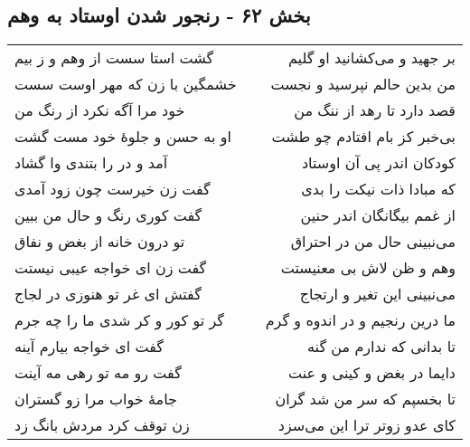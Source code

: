 \begin{center}
\section*{بخش ۶۲ - رنجور شدن اوستاد به وهم}
\label{sec:sh062}
\begin{longtable}{l p{0.5cm} r}
گشت استا سست از وهم و ز بیم
&&
بر جهید و می‌کشانید او گلیم
\\
خشمگین با زن که مهر اوست سست
&&
من بدین حالم نپرسید و نجست
\\
خود مرا آگه نکرد از رنگ من
&&
قصد دارد تا رهد از ننگ من
\\
او به حسن و جلوهٔ خود مست گشت
&&
بی‌خبر کز بام افتادم چو طشت
\\
آمد و در را بتندی وا گشاد
&&
کودکان اندر پی آن اوستاد
\\
گفت زن خیرست چون زود آمدی
&&
که مبادا ذات نیکت را بدی
\\
گفت کوری رنگ و حال من ببین
&&
از غمم بیگانگان اندر حنین
\\
تو درون خانه از بغض و نفاق
&&
می‌نبینی حال من در احتراق
\\
گفت زن ای خواجه عیبی نیستت
&&
وهم و ظن لاش بی معنیستت
\\
گفتش ای غر تو هنوزی در لجاج
&&
می‌نبینی این تغیر و ارتجاج
\\
گر تو کور و کر شدی ما را چه جرم
&&
ما درین رنجیم و در اندوه و گرم
\\
گفت ای خواجه بیارم آینه
&&
تا بدانی که ندارم من گنه
\\
گفت رو مه تو رهی مه آینت
&&
دایما در بغض و کینی و عنت
\\
جامهٔ خواب مرا زو گستران
&&
تا بخسپم که سر من شد گران
\\
زن توقف کرد مردش بانگ زد
&&
کای عدو زوتر ترا این می‌سزد
\\
\end{longtable}
\end{center}
